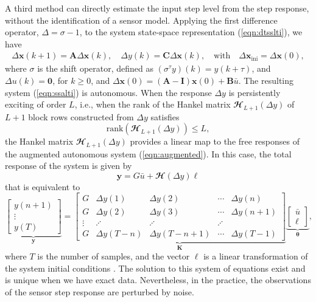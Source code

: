 A third method can directly estimate the input step level from the step response, without the identification of a sensor model.
Applying the first difference operator, $\Delta = \sigma - 1$, to the system state-space representation (\ref{eqn:dtsslti}), we have
\begin{equation} \begin{aligned} \Delta \mathbf{x}(k+1) = \mathbf{A} \Delta \mathbf{x}(k), \quad \Delta {y}(k) = \mathbf{C} \Delta \mathbf{x}(k), \quad \text{with} \quad \Delta \mathbf{x}_{\text{ini}} = \Delta \mathbf{x}(0) , \label{eqn:ssalti} \end{aligned} \end{equation}
where $\sigma$ is the shift operator, defined as $(\sigma^\tau y) (k) = y(k + \tau)$, and
$\Delta {u}(k) = \mathbf{0}$, for $k \geq 0$, and
$\Delta \mathbf{x}(0) = (\mathbf{A} - \mathbf{I}) \mathbf{x}(0) + \mathbf{B} \bar{{u}}$.
The resulting system (\ref{eqn:ssalti}) is autonomous.
When the response $\Delta {y}$ is persistently exciting of order $L$, i.e., when the rank of the Hankel matrix $\mathbfcal{H}_{L+1}(\Delta {y})$ of $L+1$ block rows constructed from $\Delta {y}$ satisfies
\begin{equation} \mathrm{rank} \left( \mathbfcal{H}_{L+1} \left( \Delta {y} \right) \right) \leq L,  \end{equation}
the Hankel matrix $\mathbfcal{H}_{L+1}(\Delta {y})$ provides a linear map to the free responses of the augmented autonomous system (\ref{eqn:augmented}).  
In this case, the total response of the system is given by 
\begin{equation*} \mathbf{y} = G \bar{u} + \mathbfcal{H}\left(\Delta {y}\right) \bm{\ell} \end{equation*}
that is equivalent to
\begin{equation} \underbrace{ \begin{bmatrix} y(n+1) \\ \vdots \\ y(T) \end{bmatrix}}_{\mathbf{y}} = \underbrace{ \begin{bmatrix} G & \Delta y(1) & \Delta y(2) & \cdots & \Delta y(n) \\ G & \Delta y(2) & \Delta y(3) & \cdots & \Delta y(n+1) \\ \vdots & \iddots & \iddots & \iddots \\ G & \Delta y(T-n) & \Delta y(T-n+1) & \cdots & \Delta y(T-1) \end{bmatrix}}_{\mathbf{K}} \underbrace{ \begin{bmatrix} \bar{{u}} \\ \bm{\ell} \end{bmatrix} }_{\bm{\theta}} , \label{eqn:ddsiemexd} \end{equation}
where $T$ is the number of samples, and the vector $\bm{\ell}$ is a linear transformation of the system initial conditions \citep{Markovsky15cep}.  
The solution to this system of equations exist and is unique when we have exact data.
Nevertheless, in the practice, the observations of the sensor step response are perturbed by noise.


